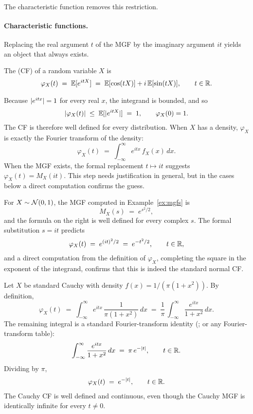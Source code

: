 The characteristic function removes this restriction.

\paragraph{Characteristic functions.}
Replacing the real argument \(t\) of the MGF by the imaginary argument \(it\) yields an object that always exists.

\begin{definition}\label{def:cf}
The  (CF) of a random variable \(X\) is
\[
  \varphi_X(t) \;=\; \mathbb{E}[e^{itX}] \;=\; \mathbb{E}[\cos(tX)] + i\, \mathbb{E}[\sin(tX)], \qquad t \in \mathbb{R}.
\]
\end{definition}

Because \(\lvert e^{itx}\rvert = 1\) for every real \(x\), the integrand is bounded, and so
\[
  \lvert\varphi_X(t)\rvert \;\le\; \mathbb{E}[\lvert e^{itX}\rvert] \;=\; 1, \qquad \varphi_X(0) = 1.
\]
The CF is therefore well defined for every distribution. When \(X\) has a density, \(\varphi_X\) is exactly the Fourier transform of the density:
\[
  \varphi_X(t) \;=\; \int_{-\infty}^\infty e^{itx}\, f_X(x)\, dx.
\]
When the MGF exists, the formal replacement \(t \mapsto it\) suggests \(\varphi_X(t) = M_X(it)\). This step needs justification in general, but in the cases below a direct computation confirms the guess.

\begin{example}\label{ex:cf-normal}
For \(X \sim \mathcal{N}(0, 1)\), the MGF computed in Example~\ref{ex:mgfs} is
\[
  M_X(s) \;=\; e^{s^2/2},
\]
and the formula on the right is well defined for every complex \(s\). The formal substitution \(s = it\) predicts
\begin{equation}
  \varphi_X(t) \;=\; e^{(it)^2 / 2} \;=\; e^{-t^2/2}, \qquad t \in \mathbb{R},
  \label{eq:cf-normal}
\end{equation}
and a direct computation from the definition of \(\varphi_X\), completing the square in the exponent of the integrand, confirms that this is indeed the standard normal CF.
\end{example}

\begin{example}\label{ex:cf-cauchy}
Let \(X\) be standard Cauchy with density \(f(x) = 1 / (\pi (1 + x^2))\). By definition,
\[
  \varphi_X(t) \;=\; \int_{-\infty}^\infty e^{itx}\, \frac{1}{\pi (1 + x^2)}\, dx
  \;=\; \frac{1}{\pi}\, \int_{-\infty}^\infty \frac{e^{itx}}{1 + x^2}\, dx.
\]
The remaining integral is a standard Fourier-transform identity (\citet[][Ch.~XV]{Feller1971}; or any Fourier-transform table):
\[
  \int_{-\infty}^\infty \frac{e^{itx}}{1 + x^2}\, dx \;=\; \pi\, e^{-\lvert t\rvert}, \qquad t \in \mathbb{R}.
\]
Dividing by \(\pi\),
\begin{equation}
  \varphi_X(t) \;=\; e^{-\lvert t\rvert}, \qquad t \in \mathbb{R}.
  \label{eq:cf-cauchy}
\end{equation}
The Cauchy CF is well defined and continuous, even though the Cauchy MGF is identically infinite for every \(t \ne 0\).
\end{example}

